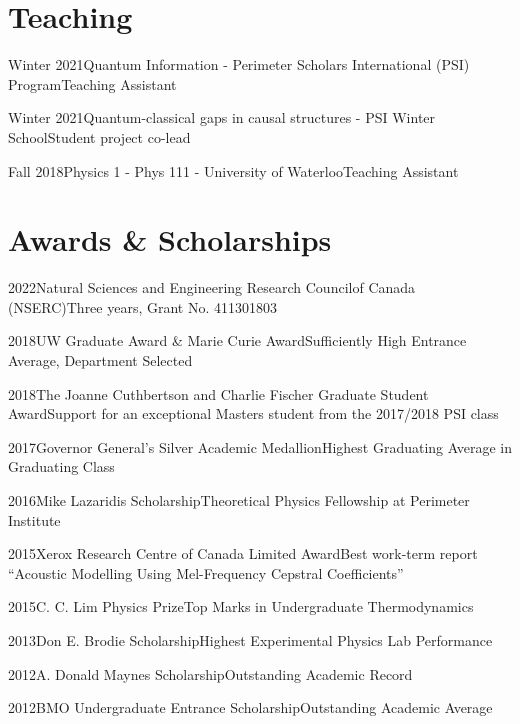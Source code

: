 \documentclass[10pt]{article}
\begin{document}
    \section{Teaching}
    \begin{teachinglist}
        \item{Winter 2021}{Quantum Information - Perimeter Scholars International (PSI) Program}{Teaching Assistant}{}
        \item{Winter 2021}{Quantum-classical gaps in causal structures  - PSI Winter School}{Student project co-lead}{}
        \item{Fall 2018}{Physics 1 - Phys 111 - University of Waterloo}{Teaching Assistant}{}
    \end{teachinglist}
    \section{Awards \& Scholarships}
    \begin{awardlist}
        \item{2022}{Natural Sciences and Engineering Research Councilof Canada (NSERC)}{Three years, Grant No. 411301803}{}
        \item{2018}{UW Graduate Award \& Marie Curie Award}{Sufficiently High Entrance Average, Department Selected}{}
        \item{2018}{The Joanne Cuthbertson and Charlie Fischer Graduate Student Award}{Support for an exceptional Masters student from the 2017/2018 PSI class}{}
        \item{2017}{Governor General's Silver Academic Medallion}{Highest Graduating Average in Graduating Class}{}
        \item{2016}{Mike Lazaridis Scholarship}{Theoretical Physics Fellowship at Perimeter Institute}{}
        \item{2015}{Xerox Research Centre of Canada Limited Award}{Best work-term report ``Acoustic Modelling Using Mel-Frequency Cepstral Coefficients''}{}
        \item{2015}{C. C. Lim Physics Prize}{Top Marks in Undergraduate Thermodynamics}{}
        \item{2013}{Don E. Brodie Scholarship}{Highest Experimental Physics Lab Performance}{}
        \item{2012}{A. Donald Maynes Scholarship}{Outstanding Academic Record}{}
        \item{2012}{BMO Undergraduate Entrance Scholarship}{Outstanding Academic Average}{}
    \end{awardlist}
    \clearpage
\end{document}
